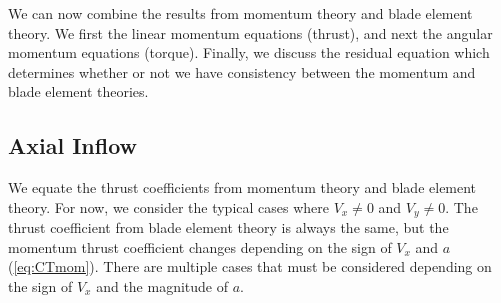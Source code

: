 \documentclass{article}
\begin{document}
We can now combine the results from momentum theory and blade element theory.  We first the linear momentum equations (thrust), and next the angular momentum equations (torque).  Finally, we discuss the residual equation which determines whether or not we have consistency between the momentum and blade element theories.

\subsection{Axial Inflow}

We equate the thrust coefficients from momentum theory and blade element theory.  For now, we consider the typical cases where $V_x \ne 0$ and $V_y \ne 0$.  The thrust coefficient from blade element theory is always the same, but the momentum thrust coefficient changes depending on the sign of $V_x$ and $a$ (\cref{eq:CTmom}).  There are multiple cases that must be considered depending on the sign of $V_x$ and the magnitude of $a$.
\end{document}
